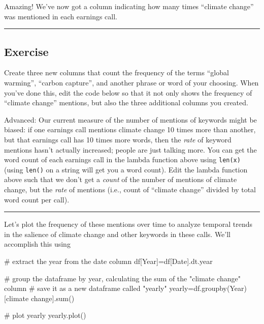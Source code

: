 \documentclass[
  letterpaper,
  DIV=11,
  numbers=noendperiod]{scrreprt}
\newenvironment{Shaded}{\begin{snugshade}}{\end{snugshade}}
\newcommand{\BuiltInTok}[1]{\textcolor[rgb]{0.00,0.23,0.31}{#1}}
\newcommand{\CommentTok}[1]{\textcolor[rgb]{0.37,0.37,0.37}{#1}}
\newcommand{\NormalTok}[1]{\textcolor[rgb]{0.00,0.23,0.31}{#1}}
\newcommand{\OperatorTok}[1]{\textcolor[rgb]{0.37,0.37,0.37}{#1}}
\newcommand{\StringTok}[1]{\textcolor[rgb]{0.13,0.47,0.30}{#1}}
\begin{document}
Amazing! We've now got a column indicating how many times ``climate
change'' was mentioned in each earnings call.

\begin{center}\rule{0.5\linewidth}{0.5pt}\end{center}

\hypertarget{exercise-9}{%
\subsection{Exercise}\label{exercise-9}}

Create three new columns that count the frequency of the terms ``global
warming'', ``carbon capture'', and another phrase or word of your
choosing. When you've done this, edit the code below so that it not only
shows the frequency of ``climate change'' mentions, but also the three
additional columns you created.

Advanced: Our current measure of the number of mentions of keywords
might be biased: if one earnings call mentions climate change 10 times
more than another, but that earnings call has 10 times more words, then
the \emph{rate} of keyword mentions hasn't actually increased; people
are just talking more. You can get the word count of each earnings call
in the lambda function above using \texttt{len(x)} (using \texttt{len()}
on a string will get you a word count). Edit the lambda function above
such that we don't get a \emph{count} of the number of mentions of
climate change, but the \emph{rate} of mentions (i.e., count of
``climate change'' divided by total word count per call).

\begin{center}\rule{0.5\linewidth}{0.5pt}\end{center}

Let's plot the frequency of these mentions over time to analyze temporal
trends in the salience of climate change and other keywords in these
calls. We'll accomplish this using

\begin{Shaded}
\begin{Highlighting}[]
\CommentTok{\# extract the year from the date column }
\NormalTok{df[}\StringTok{\textquotesingle{}Year\textquotesingle{}}\NormalTok{]}\OperatorTok{=}\NormalTok{df[}\StringTok{\textquotesingle{}Date\textquotesingle{}}\NormalTok{].dt.year}

\CommentTok{\# group the dataframe by year, calculating the sum of the "climate change" column}
\CommentTok{\# save it as a new dataframe called "yearly"}
\NormalTok{yearly}\OperatorTok{=}\NormalTok{df.groupby(}\StringTok{\textquotesingle{}Year\textquotesingle{}}\NormalTok{)[}\StringTok{\textquotesingle{}climate change\textquotesingle{}}\NormalTok{].}\BuiltInTok{sum}\NormalTok{()}

\CommentTok{\# plot yearly}
\NormalTok{yearly.plot()}
\end{Highlighting}
\end{Shaded}
\end{document}
